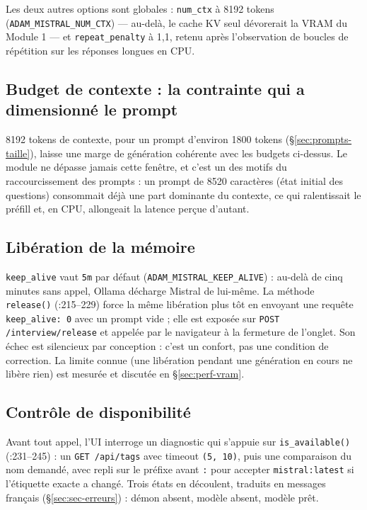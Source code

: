 Les deux autres options sont globales : \texttt{num\_ctx} à 8192 tokens
(\texttt{ADAM\_MISTRAL\_NUM\_CTX}) --- au-delà, le cache KV seul dévorerait la
VRAM du Module 1 --- et \texttt{repeat\_penalty} à 1,1, retenu après l'observation
de boucles de répétition sur les réponses longues en CPU.

\subsection{Budget de contexte : la contrainte qui a dimensionné le prompt}
\label{sec:modele-budget}

8192 tokens de contexte, pour un prompt d'environ 1800 tokens
(§\ref{sec:prompts-taille}), laisse une marge de génération cohérente avec les
budgets ci-dessus. Le module ne dépasse jamais cette fenêtre, et c'est un des
motifs du raccourcissement des prompts : un prompt de 8520 caractères (état
initial des questions) consommait déjà une part dominante du contexte, ce qui ralentissait
le préfill et, en CPU, allongeait la latence perçue d'autant.

\subsection{Libération de la mémoire}
\label{sec:modele-release}

\texttt{keep\_alive} vaut \texttt{5m} par défaut
(\texttt{ADAM\_MISTRAL\_KEEP\_ALIVE}) : au-delà de cinq minutes sans appel,
Ollama décharge Mistral de lui-même. La méthode \texttt{release()}
(:215--229) force la même libération plus tôt en envoyant une
requête \texttt{keep\_alive: 0} avec un prompt vide ; elle est exposée sur
\texttt{POST /interview/release} et appelée par le navigateur à la fermeture de
l'onglet. Son échec est silencieux par conception : c'est un confort, pas une
condition de correction. La limite connue (une libération pendant une génération
en cours ne libère rien) est mesurée et discutée en §\ref{sec:perf-vram}.

\subsection{Contrôle de disponibilité}

Avant tout appel, l'UI interroge un diagnostic qui s'appuie sur
\texttt{is\_available()} (:231--245) : un \texttt{GET
/api/tags} avec timeout \texttt{(5, 10)}, puis une comparaison du nom demandé,
avec repli sur le préfixe avant \texttt{:} pour accepter
\texttt{mistral:latest} si l'étiquette exacte a changé. Trois états en
découlent, traduits en messages français (§\ref{sec:sec-erreurs}) : démon
absent, modèle absent, modèle prêt.
